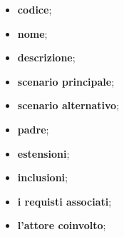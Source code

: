 \begin{itemize}
	\item \textbf{codice};
	\item \textbf{nome};
	\item \textbf{descrizione};
	\item \textbf{scenario principale};
	\item \textbf{scenario alternativo};
	\item \textbf{padre};
	\item \textbf{estensioni};
	\item \textbf{inclusioni};
	\item \textbf{i requisti associati};
	\item \textbf{l'attore coinvolto};
\end{itemize}

